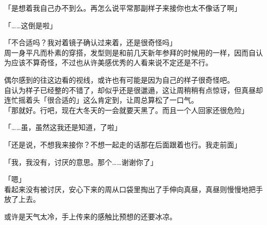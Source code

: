 「是想着我自己办不到么。再怎么说平常那副样子来接你也太不像话了啊」

「……这倒是啦」

「不合适吗？我对着镜子确认过来着，还是很奇怪吗」\\

周一身平凡而朴素的穿搭，发型则是和前几天新年参拜的时候用的一样，因而自认为应该不算奇怪，不过也从许美感优秀的人看来说不定还是不行。

偶尔感到的往这边看的视线，或许也有可能是因为自己的样子很奇怪吧。\\

自认为样子已经整的不错了，却似乎还是很邋遢，这让周稍稍有点惊讶，但真昼却连忙摇着头「很合适的」这么肯定到，让周总算松了一口气。\\

「那就好。行吧，现在大冬天的一会就要天黑了。而且一个人回家还很危险」

「……虽，虽然这我还是知道，了啦」

「还是说，不想我来接你？不想一起走的话那在后面跟着也行。我走前面」

「我，我没有，讨厌的意思。那个……谢谢你了」

「嗯」\\

看起来没有被讨厌，安心下来的周从口袋里掏出了手伸向真昼，真昼则慢慢地把手放了上去。

或许是天气太冷，手上传来的感触比预想的还要冰凉。\\

